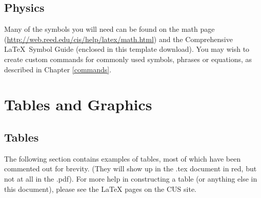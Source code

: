 \documentclass[12pt,twoside]{reedthesis}
\begin{document}
%



%   




\section{Physics}

Many of the symbols you will need can be found on the math page (\url{http://web.reed.edu/cis/help/latex/math.html}) and the Comprehensive \LaTeX\ Symbol Guide (enclosed in this template download).  You may wish to create custom commands for commonly used symbols, phrases or equations, as described in Chapter \ref{commands}.

\chapter{Tables and Graphics}

\section{Tables}
	The following section contains examples of tables, most of which have been commented out for brevity. (They will show up in the .tex document in red, but not at all in the .pdf). For more help in constructing a table (or anything else in this document), please see the LaTeX pages on the CUS site. 
\end{document}
